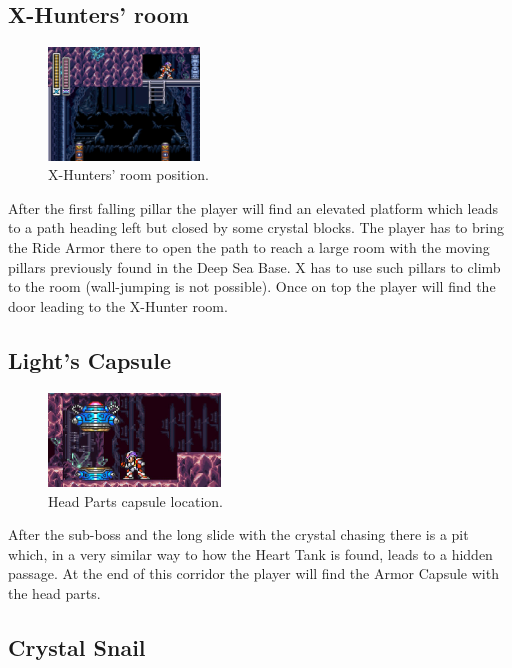 \subsection{X-Hunters' room}
\begin{figure}[htp]
	\centering
	\includegraphics[height=3cm]{figures/X2/Crystal_snail/Crystal_hunter_room.png}
	\caption{X-Hunters' room position.}
\end{figure}

After the first falling pillar the player will find an elevated platform which leads to a path heading left but closed by some crystal blocks. The player has to bring the Ride Armor there to open the path to reach a large room with the moving pillars previously found in the Deep Sea Base. X has to use such pillars to climb to the room (wall-jumping is not possible). Once on top the player will find the door leading to the X-Hunter room.

\subsection{Light's Capsule}\label{X2:Head_parts}
\begin{figure}[htp]
	\centering
	\includegraphics[height=2.5cm]{figures/X2/Crystal_snail/Crystal_capsule.jpg}
	\caption{Head Parts capsule location.}
\end{figure}
After the sub-boss and the long slide with the crystal chasing there is a pit which, in a very similar way to how the Heart Tank is found, leads to a hidden passage. At the end of this corridor the player will find the Armor Capsule with the head parts.



\subsection{Crystal Snail}\label{boss:Crystal_snail}

